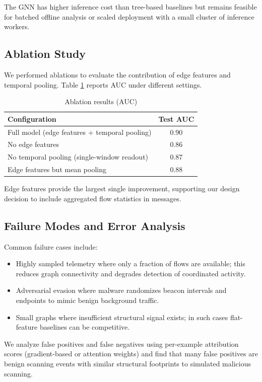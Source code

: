\documentclass[conference]{IEEEtran}
\begin{document}
The GNN has higher inference cost than tree-based baselines but remains feasible for batched offline analysis or scaled deployment with a small cluster of inference workers.

\subsection{Ablation Study}

We performed ablations to evaluate the contribution of edge features and temporal pooling. Table \ref{tab:ablation} reports AUC under different settings.

\begin{table}[ht]
\caption{Ablation results (AUC)}
\label{tab:ablation}
\centering
\begin{tabular}{|l|c|}
\hline
Configuration & Test AUC \\
\hline
Full model (edge features + temporal pooling) & 0.90 \\
No edge features & 0.86 \\
No temporal pooling (single-window readout) & 0.87 \\
Edge features but mean pooling & 0.88 \\
\hline
\end{tabular}
\end{table}

Edge features provide the largest single improvement, supporting our design decision to include aggregated flow statistics in messages.

\subsection{Failure Modes and Error Analysis}

Common failure cases include:

\begin{itemize}
  \item Highly sampled telemetry where only a fraction of flows are available; this reduces graph connectivity and degrades detection of coordinated activity.
  \item Adversarial evasion where malware randomizes beacon intervals and endpoints to mimic benign background traffic.
  \item Small graphs where insufficient structural signal exists; in such cases flat-feature baselines can be competitive.
\end{itemize}

We analyze false positives and false negatives using per-example attribution scores (gradient-based or attention weights) and find that many false positives are benign scanning events with similar structural footprints to simulated malicious scanning.
\end{document}
